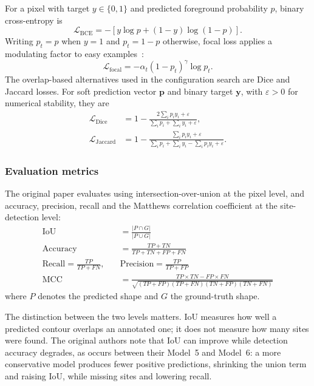 For a pixel with target $y\in\{0,1\}$ and predicted foreground probability $p$,
binary cross-entropy is
\begin{equation}
  \mathcal{L}_{\mathrm{BCE}}=-\left[y\log p+(1-y)\log(1-p)\right].
\end{equation}
Writing $p_t=p$ when $y=1$ and $p_t=1-p$ otherwise, focal loss applies a
modulating factor to easy examples~\cite{Lin17}:
\begin{equation}
  \mathcal{L}_{\mathrm{focal}}=-\alpha_t(1-p_t)^{\gamma}\log p_t.
\end{equation}
The overlap-based alternatives used in the configuration search are Dice and
Jaccard losses. For soft prediction vector $\mathbf p$ and binary target
$\mathbf y$, with $\varepsilon>0$ for numerical stability, they are
\begin{align}
  \mathcal{L}_{\mathrm{Dice}} &= 1-
  \frac{2\sum_i p_i y_i+\varepsilon}{\sum_i p_i+\sum_i y_i+\varepsilon},\\
  \mathcal{L}_{\mathrm{Jaccard}} &= 1-
  \frac{\sum_i p_i y_i+\varepsilon}
  {\sum_i p_i+\sum_i y_i-\sum_i p_i y_i+\varepsilon}.
\end{align}

\subsubsection{Evaluation metrics}

The original paper evaluates using intersection-over-union at the pixel level, and
accuracy, precision, recall and the Matthews correlation coefficient at the
site-detection level:
%
\begin{align}
  \text{IoU} &= \frac{|P \cap G|}{|P \cup G|} \\[4pt]
  \text{Accuracy} &= \frac{TP + TN}{TP + TN + FP + FN} \\[4pt]
  \text{Recall} = \frac{TP}{TP + FN}, \quad
  &\text{Precision} = \frac{TP}{TP + FP} \\[4pt]
  \text{MCC} &= \frac{TP \times TN - FP \times FN}
                    {\sqrt{(TP+FP)(TP+FN)(TN+FP)(TN+FN)}}
\end{align}
%
where $P$ denotes the predicted shape and $G$ the ground-truth shape.

The distinction between the two levels matters.
IoU measures how well a predicted contour overlaps an annotated one; it does not
measure how many sites were found.
The original authors note that IoU can improve while detection accuracy degrades, as
occurs between their Model~5 and Model~6: a more conservative model produces fewer
positive predictions, shrinking the union term and raising IoU, while missing sites
and lowering recall.

